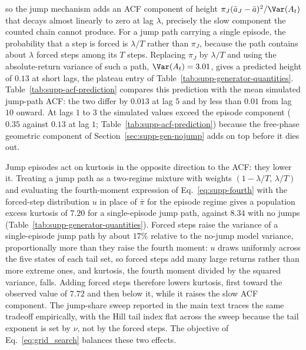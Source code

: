 so the jump mechanism adds an ACF component of height $\pi_J (\bar a_J
- \bar a)^2 / \Var(A_t)$ that decays almost linearly to zero at lag
$\lambda$, precisely the slow component the counted chain cannot
produce. For a jump path carrying a single episode, the probability
that a step is forced is $\lambda / T$ rather than $\pi_J$, because
the path contains about $\lambda$ forced steps among its $T$ steps.
Replacing $\pi_J$ by $\lambda / T$ and using the absolute-return
variance of such a path, $\Var(A_t) = 3.01$, gives a predicted height
of $0.13$ at short lags, the plateau entry of
Table~\ref{tab:supp-generator-quantities}.
Table~\ref{tab:supp-acf-prediction} compares
this prediction with the mean simulated jump-path ACF: the two differ
by $0.013$ at lag $5$ and by less than $0.01$ from lag $10$ onward. At lags $1$ to $3$ the
simulated values exceed the episode component ($0.35$ against $0.13$
at lag $1$; Table~\ref{tab:supp-acf-prediction}) because the free-phase geometric component of
Section~\ref{sec:supp-gen-nojump} adds on top before it dies out.

\begin{table}[tbp]
\centering
\caption{\textbf{Episode-overlap prediction of the jump-path
    absolute-return autocorrelation function (ACF) against
    simulation.} The prediction evaluates
    Eq.~\eqref{eq:supp-acf-wj} at the fitted SPY values with the
    single-episode forced fraction $\lambda/T$ in place of $\pi_J$
    and the same-episode probability $h(\tau)$ of
    Eq.~\eqref{eq:supp-h}. The simulated column is the mean ACF of
    $|G_t|$ over the $99$ jump-active paths among $400$ simulated
    in-sample-length paths. The free-phase component of
    Eq.~\eqref{eq:supp-acf-nj} is excluded from the prediction; it
    has decayed below $0.01$ from lag $5$ onward.}
\label{tab:supp-acf-prediction}
\small

\end{table}

Jump episodes act on kurtosis in the opposite direction to the ACF:
they lower it. Treating a jump path as a two-regime mixture with
weights $(1 - \lambda/T,\, \lambda/T)$ and evaluating the
fourth-moment expression of Eq.~\eqref{eq:supp-fourth} with the
forced-step distribution $u$ in place of $\bar\pi$ for the episode
regime gives a population excess kurtosis of $7.20$ for a
single-episode jump path, against $8.34$ with no jumps
(Table~\ref{tab:supp-generator-quantities}). Forced steps raise the
variance of a single-episode jump path by about $17\%$ relative to
the no-jump model variance, proportionally more than they raise the
fourth moment: $u$ draws uniformly across the five states of each
tail set, so forced steps add many large returns rather than more
extreme ones, and kurtosis, the fourth moment divided by the squared
variance, falls. Adding forced steps therefore lowers kurtosis, first
toward the observed value of $7.72$ and then below it, while it
raises the slow ACF component. The jump-share sweep reported in the
main text traces the same tradeoff empirically, with the Hill tail
index flat across the sweep because the tail exponent is set by
$\nu$, not by the forced steps. The objective of
Eq.~\eqref{eq:grid_search} balances these two effects.

